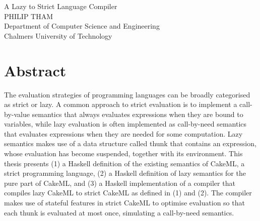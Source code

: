 \noindent
A Lazy to Strict Language Compiler\\
PHILIP THAM\\
Department of Computer Science and Engineering\\
Chalmers University of Technology \setlength{\parskip}{0.5cm}

\thispagestyle{plain}
\setlength{\parskip}{0pt plus 1.0pt}

\section*{Abstract}
  The evaluation strategies of programming languages can be broadly categorised as strict or lazy.
  A common approach to strict evaluation is to implement a call-by-value semantics
  that always evaluates expressions when they are bound to variables, while lazy
  evaluation is often implemented as call-by-need semantics that evaluates
  expressions when they are needed for some computation. Lazy semantics makes
  use of a data structure called thunk that contains an expression, whose evaluation
  has become suspended, together with its environment. This thesis presents
  (1) a Haskell definition of the existing semantics of CakeML, a strict programming
  language, (2) a Haskell definition of lazy semantics for the pure part
  of CakeML, and (3) a Haskell implementation of a compiler that compiles lazy
  CakeML to strict CakeML as defined in (1) and (2). The compiler makes
  use of stateful features in strict CakeML to optimise evaluation so that each
  thunk is evaluated at most once, simulating a call-by-need semantics.


\newpage				%
\thispagestyle{empty}
\mbox{}
